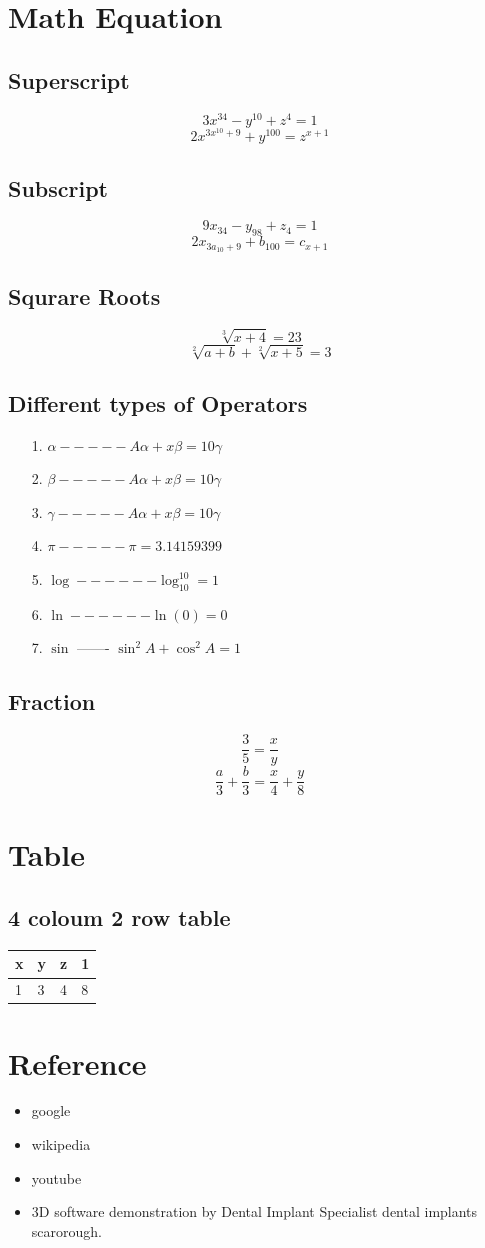 \documentclass{article}
\begin{document}
\section{Math Equation}
\subsection{Superscript}
$$3x^{34}-y^{10}+z^4=1$$
$$2x^{3x^{10}+9}+y^{100}=z^{x+1}$$
\subsection{Subscript}
$$9x_{34}-y_{98}+z_4=1$$
$$2x_{3a_{10}+9}+b_{100}=c_{x+1}$$
\subsection{Squrare Roots}
$$\sqrt[3]{x+4}=23$$     $$\sqrt[2]{a+b}+\sqrt[2]{x+5}=3$$
\subsection{Different types of Operators}
\begin{itemize}
\item[1.]
$\alpha-----A\alpha+x\beta=10\gamma$
\item[2.]
$\beta-----A\alpha+x\beta=10\gamma$
\item[3.]
$\gamma-----A\alpha+x\beta=10\gamma$
\item[4.]
$\pi-----\pi=3.14159399$
\item[5.]
$\log------\log_{10} ^{10}=1$
\item[6.]
$\ln------\ln(0)=0$
\item[7.]
$\sin$ ------- $\sin^2A+\cos^2A=1$
\end{itemize}
\subsection{Fraction}
$$\frac{3}{5}=\frac{x}{y}$$
$$\frac{a}{3}+\frac{b}{3}=\frac{x}{4}+\frac{y}{8}$$
\newpage

\section{Table}
\subsection{4 coloum 2 row table}
\begin{table}
\begin{tabular}{|l|l|l|l|}
\hline
x&y&z&1\\
\hline
1&3&4&8\\
\hline

\end{tabular}
\end{table}
\section{Reference}
\begin{itemize}
\item
google
\item
wikipedia
\item
youtube
\item
3D software demonstration by Dental Implant Specialist dental implants scarorough.

\end{itemize}
\end{document}
